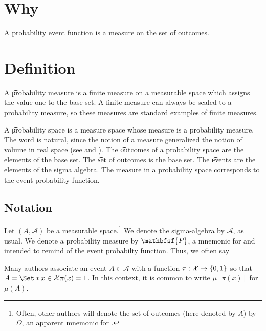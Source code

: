 

\section*{Why}

A probability event function is a measure on the set of outcomes.

\section*{Definition}

A \t{probability measure} is a finite measure on a measurable space which assigns the value one to the base set.
A finite measure can always be scaled to a probability measure, so these measures are standard examples of finite measures.

A \t{probability space} is a measure space whose measure is a probability measure.
The word  is natural, since the notion of a measure generalized the notion of volume in real space (see and ).
The \t{outcomes} of a probability space are the elements of the base set.
The \t{set of outcomes} is the base set.
The \t{events} are the elements of the sigma algebra.
The measure in a probability space corresponds to the event probability function.

\subsection*{Notation}

Let $(A, \mathcal{A} )$ be a measurable space.\footnote{Often, other authors will denote the set of outcomes (here denoted by $A$) by $\Omega $, an apparent mnemonic for .}
We denote the sigma-algebra by $\mathcal{A} $, as usual.
We denote a probability measure by $\mathbfsf{P} $, a mnemonic for  and intended to remind of the event probabilty function.
Thus, we often say 

Many authors associate an event $A \in \mathcal{A} $ with a function $\pi : \mathcal{X}  \to \{0, 1\}$ so that $A = \Set*{x \in \mathcal{X} }{\pi (x) = 1}$.
In this context, it is common to write $\mu [\pi (x)]$ for $\mu (A)$.

\blankpage